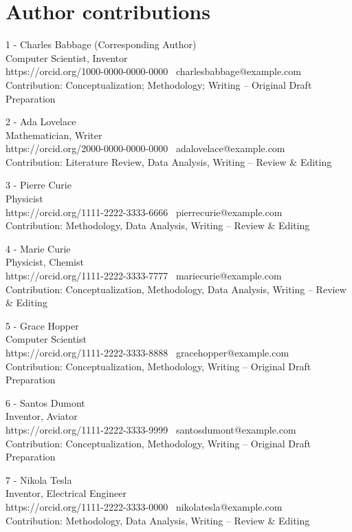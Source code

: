 \section*{Author contributions}

1 - Charles Babbage (Corresponding Author)\\
Computer Scientist, Inventor\\
https://orcid.org/1000-0000-0000-0000 \custombullet~charlesbabbage@example.com\\
Contribution: Conceptualization; Methodology; Writing – Original Draft Preparation

2 - Ada Lovelace \\
Mathematician, Writer\\
https://orcid.org/2000-0000-0000-0000 \custombullet~adalovelace@example.com\\
Contribution: Literature Review, Data Analysis, Writing – Review \& Editing

3 - Pierre Curie\\
Physicist\\
https://orcid.org/1111-2222-3333-6666 \custombullet~pierrecurie@example.com\\
Contribution: Methodology, Data Analysis, Writing – Review \& Editing

4 - Marie Curie\\
Physicist, Chemist\\
https://orcid.org/1111-2222-3333-7777 \custombullet~mariecurie@example.com \\
Contribution: Conceptualization, Methodology, Data Analysis, Writing – Review \& Editing

5 - Grace Hopper\\
Computer Scientist\\
https://orcid.org/1111-2222-3333-8888 \custombullet~gracehopper@example.com\\
Contribution: Conceptualization, Methodology, Writing – Original Draft Preparation

6 - Santos Dumont\\
Inventor, Aviator\\
https://orcid.org/1111-2222-3333-9999 \custombullet~santosdumont@example.com\\
Contribution: Conceptualization, Methodology, Writing – Original Draft Preparation

7 - Nikola Tesla\\
Inventor, Electrical Engineer\\
https://orcid.org/1111-2222-3333-0000 \custombullet~nikolatesla@example.com\\
Contribution: Methodology, Data Analysis, Writing – Review \& Editing

